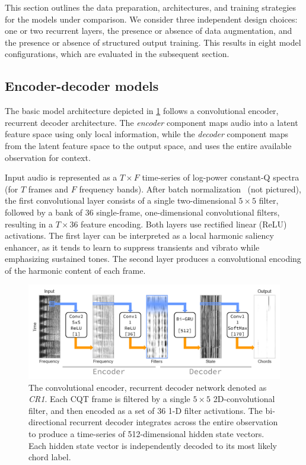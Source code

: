 \documentclass{article}
\begin{document}

This section outlines the data preparation, architectures, and training strategies for the models under comparison.
We consider three independent design choices: one or two recurrent layers, the presence or absence of data augmentation, and the presence or absence of structured output training.
This results in eight model configurations, which are evaluated in the subsequent section.

\subsection{Encoder-decoder models}

The basic model architecture depicted in \cref{fig:crnn1} follows a convolutional encoder, recurrent decoder architecture.
The \emph{encoder} component maps audio into a latent feature space using only local information, while the \emph{decoder} component maps from the latent feature space to the output space, and uses the entire available observation for context.

Input audio is represented as a $T\times F$ time-series of log-power constant-Q spectra (for $T$ frames and $F$ frequency bands).
After batch normalization~\cite{ioffe2015batch} (not pictured), the first convolutional layer consists of a single two-dimensional $5\times5$ filter, followed by a bank of $36$ single-frame, one-dimensional convolutional filters, resulting in a $T\times 36$ feature encoding.
Both layers use rectified linear (ReLU) activations.
The first layer can be interpreted as a local harmonic saliency enhancer, as it tends to learn to suppress transients and vibrato while emphasizing sustained tones.
The second layer produces a convolutional encoding of the harmonic content of each frame.

\begin{figure}
    \centering
    \includegraphics[width=\columnwidth]{crnn1}
    \caption{The convolutional encoder, recurrent decoder network denoted as \emph{CR1}.
            Each CQT frame is filtered by a single $5\times 5$ 2D-convolutional filter, and then encoded as a set of 36 1-D filter activations.
            The bi-directional recurrent decoder integrates across the entire observation to produce a time-series of 512-dimensional hidden state vectors. 
            Each hidden state vector is independently decoded to its most likely chord label.\label{fig:crnn1}}
\end{figure}
\end{document}

